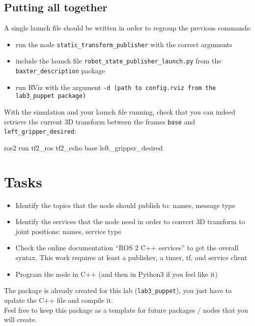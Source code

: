 \documentclass{ecnreport}
\begin{document}
\subsection{Putting all together}

A single launch file should be written in order to regroup the previous commands:
\begin{itemize}
 \item run the node \texttt{static\_transform\_publisher} with the correct arguments
 \item include the launch file \texttt{robot\_state\_publisher\_launch.py} from the \texttt{baxter\_description} package
 \item run RViz with the argument \texttt{-d (path to config.rviz from the lab3\_puppet package)}
 \end{itemize}
 
 With the simulation and your launch file running, check that you can indeed retrieve the current 3D transform between the frames \texttt{base} and \texttt{left\_gripper\_desired}:
 \begin{bashcodelarge}
 ros2 run tf2_ros tf2_echo base left_gripper_desired
\end{bashcodelarge}



\section{Tasks}

\begin{itemize}
\item Identify the topics that the node should publish to: names, message type
\item Identify the services that the node need in order to convert 3D transform to joint positions: names, service type
\item Check the online documentation ``ROS 2 C++ services'' to get the overall syntax. This work requires at least a publisher, a timer, tf, and service client
\item Program the node in C++ (and then in Python3 if you feel like it)
\end{itemize}

The package is already created for this lab (\texttt{lab3\_puppet}), you just have to update the C++ file and compile it.\\
Feel free to keep this package as a template for future packages / nodes that you will create.
\end{document}
